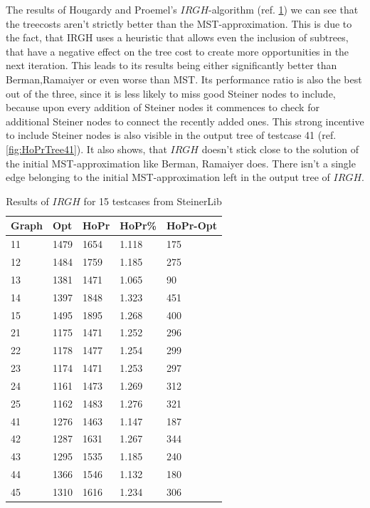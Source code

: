 The results of Hougardy and Proemel's $IRGH$-algorithm (ref. \ref{tab:HoPrResults}) we can see that the treecosts aren't strictly better than the MST-approximation. This is due to the fact, that IRGH uses a heuristic that allows even the inclusion of subtrees, that have a negative effect on the tree cost to create more opportunities in the next iteration. This leads to its results being either significantly better than Berman,Ramaiyer or even worse than MST. Its performance ratio is also the best out of the three, since it is less likely to miss good Steiner nodes to include, because upon every addition of Steiner nodes it commences to check for additional Steiner nodes to connect the recently added ones. This strong incentive to include Steiner nodes is also visible in the output tree of testcase 41 (ref. \ref{fig:HoPrTree41}). It also shows, that $IRGH$ doesn't stick close to the solution of the initial MST-approximation like Berman, Ramaiyer does. There isn't a single edge belonging to the initial MST-approximation left in the output tree of $IRGH$.

\begin{table}[htbp]
 \caption{Results of $IRGH$ for 15 testcases from SteinerLib \cite{Dui93}}\label{tab:HoPrResults} 	
 \centering
 \begin{tabular}{l l l l l}
\toprule
Graph & Opt & HoPr & HoPr\% & HoPr-Opt \\
\midrule
11	& 1479	& 1654	& 1.118	& 175 \\
12	& 1484	& 1759	& 1.185	& 275 \\
13	& 1381	& 1471	& 1.065	& 90 \\
14	& 1397	& 1848	& 1.323	& 451 \\
15	& 1495	& 1895	& 1.268	& 400 \\
\midrule 
21	& 1175	& 1471	& 1.252	& 296 \\
22	& 1178	& 1477	& 1.254	& 299 \\
23	& 1174	& 1471	& 1.253	& 297 \\
24	& 1161	& 1473	& 1.269 	& 312 \\
25	& 1162	& 1483	& 1.276	& 321 \\
\midrule
41	& 1276	& 1463	& 1.147	& 187 \\
42	& 1287	& 1631	& 1.267	& 344 \\
43	& 1295	& 1535	& 1.185	& 240 \\
44	& 1366	& 1546	& 1.132	& 180 \\
45	& 1310	& 1616	& 1.234	& 306 \\
\bottomrule
\end{tabular}
\end{table}

